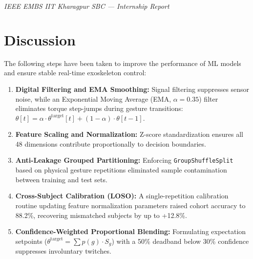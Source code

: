 \documentclass[12pt,a4paper]{article}
\begin{document}
\vfill
\begin{center}
    \footnotesize\textit{IEEE EMBS IIT Kharagpur SBC --- Internship Report}
\end{center}

\newpage
\section{Discussion}\label{sec:discussion}

The following steps have been taken to improve the performance of ML models and ensure stable real-time exoskeleton control:
\begin{enumerate}[leftmargin=*]
    \item \textbf{Digital Filtering and EMA Smoothing:} Signal filtering suppresses sensor noise, while an Exponential Moving Average (EMA, $\alpha=0.35$) filter eliminates torque step-jumps during gesture transitions: $\theta[t] = \alpha \cdot \theta^{\text{target}}[t] + (1 - \alpha) \cdot \theta[t-1]$.
    \item \textbf{Feature Scaling and Normalization:} Z-score standardization ensures all 48 dimensions contribute proportionally to decision boundaries.
    \item \textbf{Anti-Leakage Grouped Partitioning:} Enforcing \texttt{GroupShuffleSplit} based on physical gesture repetitions eliminated sample contamination between training and test sets.
    \item \textbf{Cross-Subject Calibration (LOSO):} A single-repetition calibration routine updating feature normalization parameters raised cohort accuracy to 88.2\%, recovering mismatched subjects by up to +12.8\%.
    \item \textbf{Confidence-Weighted Proportional Blending:} Formulating expectation setpoints ($\theta^{\text{target}} = \sum p(g) \cdot S_g$) with a 50\% deadband below 30\% confidence suppresses involuntary twitches.
\end{enumerate}
\end{document}
